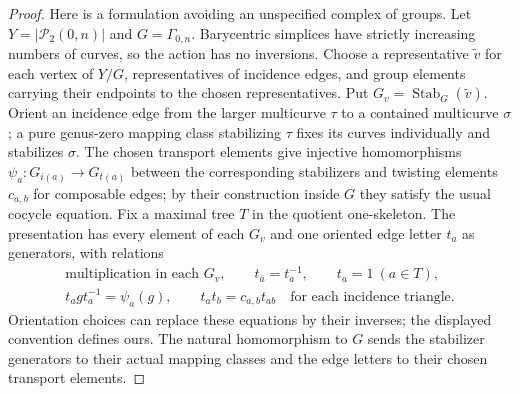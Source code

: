 \begin{proof}
Here is a formulation avoiding an unspecified complex of
groups.  Let $Y=|\mathcal P_2(0,n)|$ and $G=\Gamma_{0,n}$.
Barycentric simplices have strictly increasing numbers of
curves, so the action has no inversions.  Choose a representative
$\widetilde v$ for each vertex of $Y/G$, representatives of
incidence edges, and group elements carrying their endpoints
to the chosen representatives.  Put $G_v=\operatorname{Stab}_G
(\widetilde v)$.  Orient an incidence edge from the larger multicurve
$\tau$ to a contained multicurve $\sigma$; a pure genus-zero mapping
class stabilizing $\tau$ fixes its curves individually and stabilizes
$\sigma$.  The chosen transport elements give injective
homomorphisms $\psi_a:G_{i(a)}\longrightarrow G_{t(a)}$ between
the corresponding stabilizers
and twisting elements $c_{a,b}$ for composable edges; by their
construction inside $G$ they satisfy the usual cocycle equation.
Fix a maximal tree $T$ in the quotient one-skeleton.
The presentation has every element of each $G_v$ and one
oriented edge letter $t_a$ as generators, with relations
\[
 \begin{gathered}
 \text{multiplication in each }G_v,\qquad
 t_{\bar a}=t_a^{-1},\qquad t_a=1\ (a\in T),\\
 t_a g t_a^{-1}=\psi_a(g),\qquad
 t_a t_b=c_{a,b}t_{ab}
 \quad\text{for each incidence triangle.}
 \end{gathered}
\]
Orientation choices can replace these equations by their
inverses; the displayed convention defines ours.  The natural
homomorphism to $G$ sends the stabilizer generators to their
actual mapping classes and the edge letters to their chosen
transport elements.


\end{proof}
